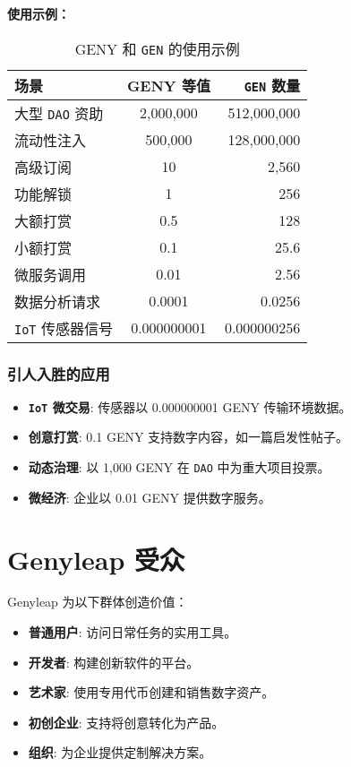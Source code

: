 \documentclass[a4paper,12pt,openany]{book}
\begin{document}
\textbf{使用示例：}
\begin{table}[h]
\centering
\caption{GENY 和 \texttt{GEN} 的使用示例}
\small
\begin{tabular}{l c r}
\hline
\textbf{场景} & \textbf{GENY 等值} & \textbf{\texttt{GEN} 数量} \\
\hline
大型 \texttt{DAO} 资助 & 2,000,000 & 512,000,000 \\
流动性注入 & 500,000 & 128,000,000 \\
高级订阅 & 10 & 2,560 \\
功能解锁 & 1 & 256 \\
大额打赏 & 0.5 & 128 \\
小额打赏 & 0.1 & 25.6 \\
微服务调用 & 0.01 & 2.56 \\
数据分析请求 & 0.0001 & 0.0256 \\
\texttt{IoT} 传感器信号 & 0.000000001 & 0.000000256 \\
\hline
\end{tabular}
\end{table}

\subsection*{引人入胜的应用}
\begin{itemize}
    \item \textbf{\texttt{IoT} 微交易}: 传感器以 0.000000001 GENY 传输环境数据。
    \item \textbf{创意打赏}: 0.1 GENY 支持数字内容，如一篇启发性帖子。
    \item \textbf{动态治理}: 以 1,000 GENY 在 \texttt{DAO} 中为重大项目投票。
    \item \textbf{微经济}: 企业以 0.01 GENY 提供数字服务。
\end{itemize}

\chapter{Genyleap 受众}
Genyleap 为以下群体创造价值：
\begin{itemize}
    \item \textbf{普通用户}: 访问日常任务的实用工具。
    \item \textbf{开发者}: 构建创新软件的平台。
    \item \textbf{艺术家}: 使用专用代币创建和销售数字资产。
    \item \textbf{初创企业}: 支持将创意转化为产品。
    \item \textbf{组织}: 为企业提供定制解决方案。
\end{itemize}
\end{document}
